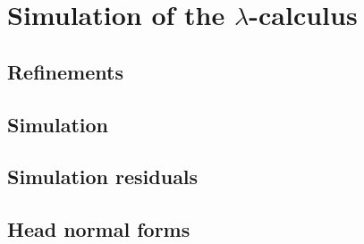 
\chapter{Simulation of the $\lambda$-calculus}

\section{Refinements}

\section{Simulation}

\section{Simulation residuals}

\section{Head normal forms}
